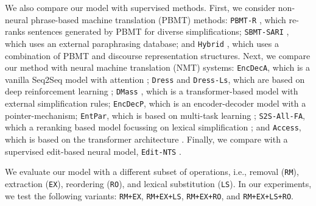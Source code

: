 \documentclass[11pt,a4paper]{article}
\begin{document}
We also compare our model with supervised methods.
First, we consider non-neural phrase-based machine translation (PBMT) methods: {\tt PBMT-R} \cite{wubben2012sentence}, which re-ranks sentences generated by PBMT for diverse simplifications; {\tt SBMT-SARI} \cite{xu-etal-2016-optimizing}, which uses an external paraphrasing database; and {\tt Hybrid} \cite{narayan2014hybrid}, which uses a combination of PBMT and discourse representation structures.
Next, we compare our method with neural machine translation (NMT) systems: {\tt EncDecA}, which is a vanilla Seq2Seq model with attention \cite{nisioi2017exploring}; {\tt Dress} and {\tt Dress-Ls}, which are based on deep reinforcement learning \cite{zhang2017sentence}; {\tt DMass}  \cite{zhao2018integrating}, which is a transformer-based model with external simplification rules; {\tt EncDecP}, which is an encoder-decoder model with a pointer-mechanism; {\tt EntPar}, which is based on multi-task learning \cite{guo2018dynamic}; {\tt S2S-All-FA}, which a reranking based model focussing on lexical simplification \cite{kriz2019complexity}; and {\tt Access}, which is based on the transformer architecture \cite{martin2019controllable}. Finally, we compare with a supervised edit-based neural model, {\tt Edit-NTS} \cite{dong2019editnts}.

We evaluate our model with a different subset of operations, i.e., removal ({\tt RM}), extraction ({\tt EX}), reordering ({\tt RO}), and lexical substitution ({\tt LS}). 
In our experiments, we test the following variants: {\tt RM+EX}, {\tt RM+EX+LS}, {\tt RM+EX+RO}, and {\tt RM+EX+LS+RO}.
\end{document}
